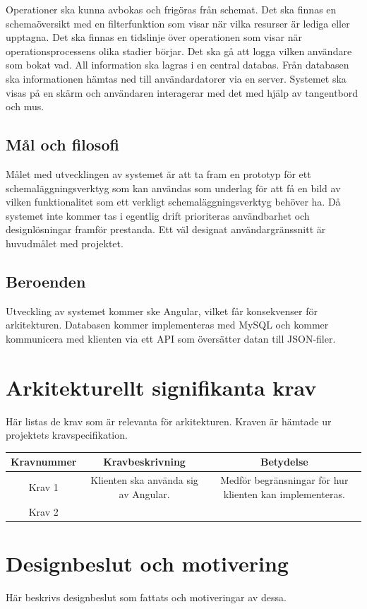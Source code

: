 \documentclass[a4paper,10pt]{article}
\begin{document}
Operationer ska kunna avbokas och frigöras från schemat. Det ska finnas en schemaöversikt med en filterfunktion som visar när vilka resurser är lediga eller upptagna. Det ska finnas en tidslinje över operationen som visar när operationsprocessens olika stadier börjar. Det ska gå att logga vilken användare som bokat vad. All information ska lagras i en central databas. Från databasen ska informationen hämtas ned till användardatorer via en server. Systemet ska visas på en skärm och användaren interagerar med det med hjälp av tangentbord och mus.


\subsection{Mål och filosofi}
Målet med utvecklingen av systemet är att ta fram en prototyp för ett schemaläggningsverktyg som kan användas som underlag för att få en bild av vilken funktionalitet som ett verkligt schemaläggningsverktyg behöver ha. Då systemet inte kommer tas i egentlig drift prioriteras användbarhet och designlösningar framför prestanda. Ett väl designat användargränssnitt är huvudmålet med projektet.

\subsection{Beroenden}
Utveckling av systemet kommer ske Angular, vilket får konsekvenser för arkitekturen. Databasen kommer implementeras med MySQL och kommer kommunicera med klienten via ett API som översätter datan till JSON-filer.

\section{Arkitekturellt signifikanta krav}
Här listas de krav som är relevanta för arkitekturen. Kraven är hämtade ur projektets kravspecifikation.

\begin{tabular}{|c|c|c|}
  \hline
  Kravnummer & Kravbeskrivning & Betydelse \\
  \hline
  Krav 1 & Klienten ska använda sig av Angular. & Medför begränsningar för hur klienten kan implementeras. \\
  \hline
  Krav 2 &
\end{tabular}


\section{Designbeslut och motivering}
Här beskrivs designbeslut som fattats och motiveringar av dessa.
\end{document}
